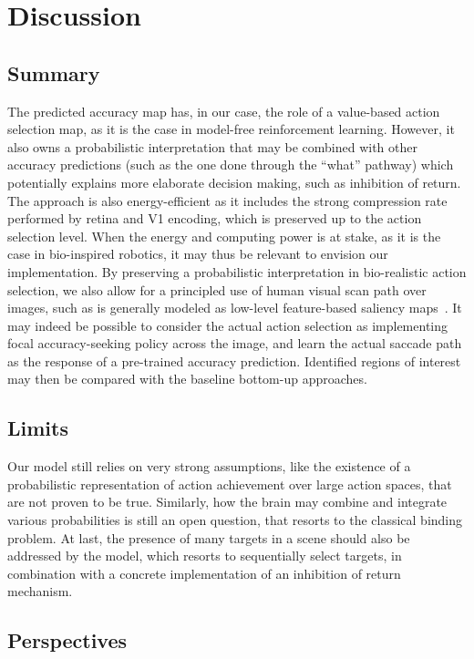 \section{Discussion}
\label{sec:discussion}

\subsection{Summary}
The predicted accuracy map has, in our case, the role of a value-based action selection map, as it is the case in model-free reinforcement learning. However, it also owns a probabilistic interpretation that may be combined with other accuracy predictions (such as the one done through the ``what'' pathway) which potentially explains more elaborate decision making, such as inhibition of return. The approach is also energy-efficient as it includes the strong compression rate performed by retina and V1 encoding, which is preserved up to the action selection level. When the energy and computing power is at stake, as it is the case in bio-inspired robotics, it may thus be relevant to envision our implementation. By preserving a probabilistic interpretation in bio-realistic action selection, we also allow for a principled use of human visual scan path over images, such as is generally modeled as low-level feature-based saliency maps~\citep{Itti01}. It may indeed be possible to consider the actual action selection as implementing focal accuracy-seeking policy across the image, and learn the actual saccade path as the response of a pre-trained accuracy prediction. Identified regions of interest may then be compared with the baseline bottom-up approaches.


\subsection{Limits}


Our model still relies on very strong assumptions, like the existence of a probabilistic representation of action achievement over large action spaces, that are not proven to be true. Similarly, how the brain may combine and integrate various probabilities is still an open question, that resorts to the classical binding problem. %
At last, the presence of many targets in a scene should also be addressed by the model, which resorts to sequentially select targets, in combination with a concrete implementation of an inhibition of return mechanism.


\subsection{Perspectives}
